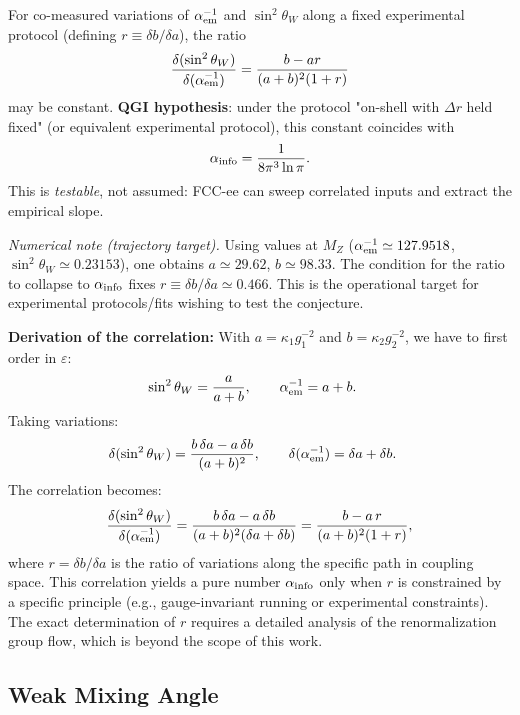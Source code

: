 \documentclass{article}
\numberwithin{equation}{section}
\theoremstyle{plain}
\theoremstyle{definition}
\theoremstyle{remark}
\begin{document}
\begin{tcolorbox}[title={Conjecture 1 (electroweak; path dependence)}, colback=blue!1,colframe=blue!40!black]
For co-measured variations of $\alpha_{\rm em}^{-1}$ and $\sin^2\theta_W$ along a fixed experimental protocol (defining $r\equiv\delta b/\delta a$), the ratio
\[
\frac{\delta(\sin^2\theta_W)}{\delta(\alpha_{\rm em}^{-1})}
= \frac{b-ar}{(a+b)^2(1+r)}
\]
may be constant. \textbf{QGI hypothesis}: under the protocol "on-shell with $\Delta r$ held fixed" (or equivalent experimental protocol), this constant coincides with
\[
\alpha_{\rm info}=\frac{1}{8\pi^3\ln\pi}.
\]
This is \emph{testable}, not assumed: FCC-ee can sweep correlated inputs and extract the empirical slope.
\end{tcolorbox}

\noindent\emph{Numerical note (trajectory target).} Using values at $M_Z$ ($\alpha_{\rm em}^{-1}\simeq 127.9518$, $\sin^2\theta_W\simeq 0.23153$), one obtains $a\simeq 29.62$, $b\simeq 98.33$. The condition for the ratio to collapse to $\alpha_{\rm info}$ fixes $r\equiv \delta b/\delta a \simeq 0.466$. This is the operational target for experimental protocols/fits wishing to test the conjecture.

\textbf{Derivation of the correlation:} With $a = \kappa_1 g_1^{-2}$ and $b = \kappa_2 g_2^{-2}$, we have to first order in $\varepsilon$:
\begin{align}
\sin^2\theta_W &= \frac{a}{a+b}, \qquad \alpha_{\rm em}^{-1} = a+b.
\end{align}
Taking variations:
\begin{align}
\delta(\sin^2\theta_W) &= \frac{b\,\delta a - a\,\delta b}{(a+b)^2}, \qquad \delta(\alpha_{\rm em}^{-1}) = \delta a + \delta b.
\end{align}
The correlation becomes:
\begin{equation}
\frac{\delta(\sin^2\theta_W)}{\delta(\alpha_{\rm em}^{-1})} = \frac{b\,\delta a - a\,\delta b}{(a+b)^2(\delta a + \delta b)} = \frac{b - a\,r}{(a+b)^2(1 + r)},
\end{equation}
where $r = \delta b/\delta a$ is the ratio of variations along the specific path in coupling space. This correlation yields a pure number $\alpha_{\rm info}$ only when $r$ is constrained by a specific principle (e.g., gauge-invariant running or experimental constraints). The exact determination of $r$ requires a detailed analysis of the renormalization group flow, which is beyond the scope of this work.

\subsection{Weak Mixing Angle}
\label{subsec:sin2theta}
\end{document}
